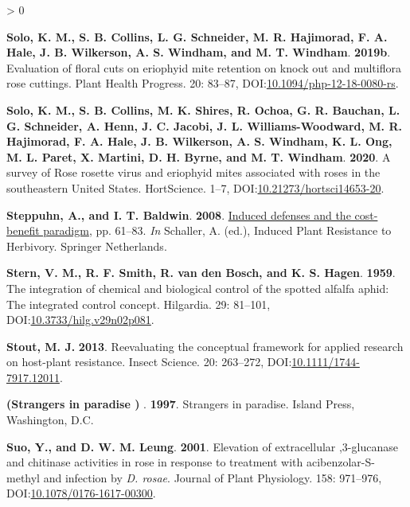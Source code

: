 \documentclass{ufdissertation}[overrideChapters] %
\newlength{\cslhangindent}
\newenvironment{CSLReferences}[2] %
 {%
  \setlength{\parindent}{0pt}
  \ifodd #1 \everypar{\setlength{\hangindent}{\cslhangindent}}\ignorespaces\fi
  \ifnum #2 > 0
  \setlength{\parskip}{#2\baselineskip}
  \fi
 }%
 {}
\begin{document}
{\begin{CSLReferences}{1}{1}
\leavevmode{}%
\textbf{Solo, K. M., S. B. Collins, L. G. Schneider, M. R. Hajimorad, F. A. Hale, J. B. Wilkerson, A. S. Windham, and M. T. Windham}. \textbf{2019b}. Evaluation of floral cuts on eriophyid mite retention on knock out and multiflora rose cuttings. Plant Health Progress. 20: 83--87, DOI:\href{https://doi.org/10.1094/php-12-18-0080-rs}{10.1094/php-12-18-0080-rs}.

\leavevmode{}%
\textbf{Solo, K. M., S. B. Collins, M. K. Shires, R. Ochoa, G. R. Bauchan, L. G. Schneider, A. Henn, J. C. Jacobi, J. L. Williams-Woodward, M. R. Hajimorad, F. A. Hale, J. B. Wilkerson, A. S. Windham, K. L. Ong, M. L. Paret, X. Martini, D. H. Byrne, and M. T. Windham}. \textbf{2020}. A survey of {Rose rosette virus} and eriophyid mites associated with roses in the southeastern {United States}. {HortScience}. 1--7, DOI:\href{https://doi.org/10.21273/hortsci14653-20}{10.21273/hortsci14653-20}.

\leavevmode{}%
\textbf{Steppuhn, A., and I. T. Baldwin}. \textbf{2008}. \href{https://doi.org/10.1007/978-1-4020-8182-8_3}{Induced defenses and the cost-benefit paradigm}, pp. 61--83. \emph{In} Schaller, A. (ed.), Induced Plant Resistance to Herbivory. Springer Netherlands.

\leavevmode{}%
\textbf{Stern, V. M., R. F. Smith, R. van den Bosch, and K. S. Hagen}. \textbf{1959}. The integration of chemical and biological control of the spotted alfalfa aphid: The integrated control concept. Hilgardia. 29: 81--101, DOI:\href{https://doi.org/10.3733/hilg.v29n02p081}{10.3733/hilg.v29n02p081}.

\leavevmode{}%
\textbf{Stout, M. J.} \textbf{2013}. Reevaluating the conceptual framework for applied research on host-plant resistance. Insect Science. 20: 263--272, DOI:\href{https://doi.org/10.1111/1744-7917.12011}{10.1111/1744-7917.12011}.

\leavevmode{}%
\textbf{(Strangers in paradise ) }. \textbf{1997}. Strangers in paradise. Island Press, Washington, D.C.

\leavevmode{}%
\textbf{Suo, Y., and D. W. M. Leung}. \textbf{2001}. Elevation of extracellular ,3-glucanase and chitinase activities in rose in response to treatment with acibenzolar-{S}-methyl and infection by {\emph{D. rosae}}. Journal of Plant Physiology. 158: 971--976, DOI:\href{https://doi.org/10.1078/0176-1617-00300}{10.1078/0176-1617-00300}.


\end{CSLReferences}}
\end{document}
